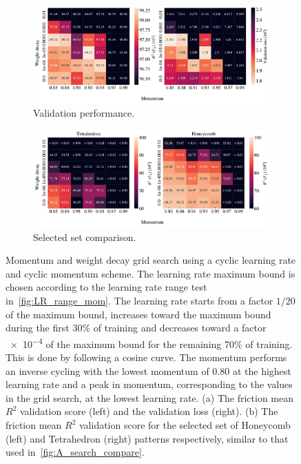 \begin{figure}[H]
  \centering
  \begin{subfigure}[t]{1.0\textwidth}
      \centering
      \includegraphics[width=1\textwidth]{figures/ML/mom_weight_search_cyclic_perf.pdf}
      \caption{Validation performance.}
  \end{subfigure}
  \hfill
  \begin{subfigure}[t]{1.0\textwidth}
      \centering
      \includegraphics[width=1\textwidth]{figures/ML/mom_weight_search_compare_cyclic_perf.pdf}
      \caption{Selected set comparison.}
  \end{subfigure}
  \hfill
  \caption{Momentum and weight decay grid search using a cyclic learning rate and cyclic momentum scheme. The learning rate maximum bound is chosen according to the learning rate range test in~\cref{fig:LR_range_mom}. The learning rate starts from a factor $1/20$ of the maximum bound, increases toward the maximum bound during the first $30\%$ of training and decreases toward a factor \num{e-4} of the maximum bound for the remaining 70\% of training. This is done by following a cosine curve. The momentum performs an inverse cycling with the lowest momentum of 0.80 at the highest learning rate and a peak in momentum, corresponding to the values in the grid search, at the lowest learning rate. (a) The friction mean $R^2$ validation score (left) and the validation loss (right). (b) The friction mean $R^2$ validation score for the selected set of Honeycomb (left) and Tetrahedron (right) patterns respectively, similar to that used in~\cref{fig:A_search_compare}.}
  \label{fig:mom_weight_search_cyclic}
\end{figure}


